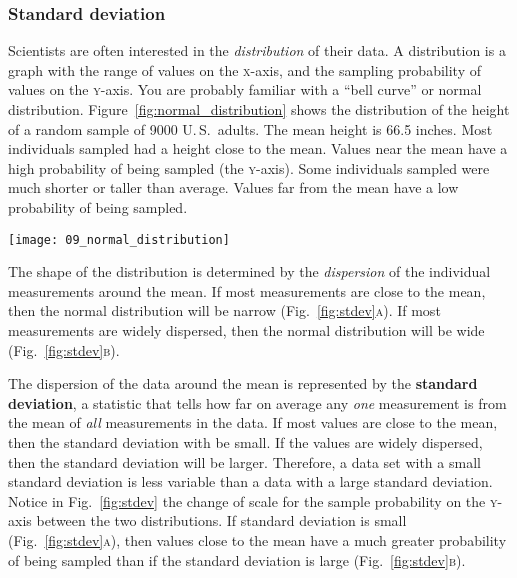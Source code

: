 \documentclass[12pt]{exam}
\begin{document}
\begin{questions}
\newpage

\subsubsection*{Standard deviation}

Scientists are often interested in the \emph{distribution} of their
data. A distribution is a graph with the range of values on the \textsc{x}-axis,
and the sampling probability of values on the \textsc{y}-axis. You are probably familiar
with a ``bell curve'' or normal distribution. Figure~\ref{fig:normal_distribution} 
shows the distribution of the height of a random sample of 9000 U.\,S.\ adults.
The mean height is 66.5 inches. Most individuals sampled had a height close
to the mean. Values near the mean have a high probability of being sampled 
(the \textsc{y}-axis). Some individuals sampled were much shorter or taller than average.
Values far from the mean have a low probability of being sampled.

\medskip

\hfil\begin{minipage}{0.8\textwidth}
	\texttt{[image: 09\_normal\_distribution]}
\end{minipage}\hfill

\medskip

The shape of the distribution is determined by the \emph{dispersion} of the 
individual measurements around the mean. If most measurements are close 
to the mean, then the normal distribution will be narrow (Fig.~\ref{fig:stdev}\textsc{a}).
If most measurements are widely dispersed, then the normal distribution will be
wide (Fig.~\ref{fig:stdev}\textsc{b}). 

The dispersion of the data around the mean is represented by the
\textbf{standard deviation}, a statistic that tells how far on average any
\emph{one} measurement is from the mean of \emph{all} measurements in 
the data. If most values are close to the mean, then the standard deviation
with be small. If the values are widely dispersed, then the standard deviation
will be larger. Therefore, a data set with a small standard deviation is less 
variable than a data with a large standard deviation. Notice in Fig.~\ref{fig:stdev} the change of scale 
for the sample probability on the
\textsc{y}-axis between the two distributions. If standard deviation is small 
(Fig.~\ref{fig:stdev}\textsc{a}), then values close to the mean have a much greater 
probability of being sampled than if the standard deviation is large (Fig.~\ref{fig:stdev}\textsc{b}).



\end{questions}
\end{document}

